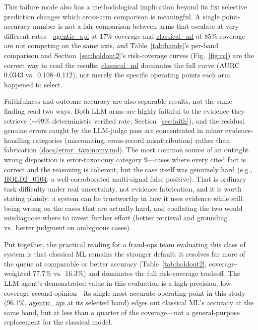 \documentclass[]{ieeeaccess}
\newcommand{\code}[1]{\url{#1}}
\begin{document}
This failure mode also has a methodological implication beyond its fix:
selective prediction changes which cross-arm comparison is meaningful. A
single point-accuracy number is not a fair comparison between arms that
escalate at very different rates---\code{agentic_api} at 17\% coverage
and \code{classical_ml} at 85\% coverage are not competing on the same
axis, and Table~\ref{tab:bands}'s per-band comparison and Section~\ref{sec:holdout2}'s risk-coverage
curves (Fig.~\ref{fig:rc}) are the correct way to read the results:
\code{classical_ml} dominates the full curve (AURC 0.0343 vs.\
0.108--0.112), not merely the specific operating points each arm
happened to select.

Faithfulness and outcome accuracy are also separable results, not the
same finding read two ways. Both LLM arms are highly faithful to the
evidence they retrieve (${\sim}99\%$ deterministic verified rate, Section~\ref{sec:faith}), and the residual genuine errors caught by the LLM-judge pass are
concentrated in minor evidence-handling categories (miscounting,
cross-record misattribution) rather than fabrication
(\code{docs/error_taxonomy.md}). The most common source of an outright
wrong disposition is error-taxonomy category 9---cases where every
cited fact is correct and the reasoning is coherent, but the case itself
was genuinely hard (e.g., \code{HOLD2_0104}: a well-corroborated
multi-signal false positive). That is ordinary task difficulty under
real uncertainty, not evidence fabrication, and it is worth stating
plainly: a system can be trustworthy in how it uses evidence while still
being wrong on the cases that are actually hard, and conflating the two
would misdiagnose where to invest further effort (better retrieval and
grounding vs.\ better judgment on ambiguous cases).

Put together, the practical reading for a fraud-ops team evaluating this
class of system is that classical ML remains the stronger default: it
resolves far more of the queue at comparable or better accuracy (Table~\ref{tab:holdout2},
coverage-weighted 77.7\% vs.\ 16.3\%) and dominates the full
risk-coverage tradeoff. The LLM agent's demonstrated value in this
evaluation is a high-precision, low-coverage second opinion---its single
most accurate operating point in this study (96.1\%, \code{agentic_api}
at its selected band) edges out classical ML's accuracy at the same
band, but at less than a quarter of the coverage---not a general-purpose
replacement for the classical model.
\end{document}
